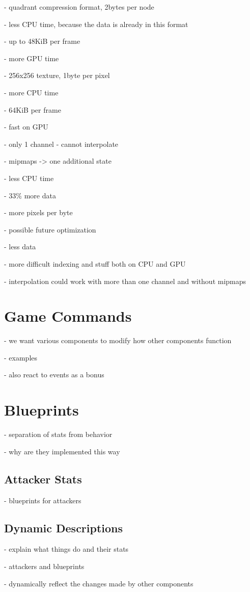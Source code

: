 - quadrant compression format, 2bytes per node

- less CPU time, because the data is already in this format

- up to 48KiB per frame

- more GPU time

- 256x256 texture, 1byte per pixel

- more CPU time

- 64KiB per frame

- fast on GPU

- only 1 channel - cannot interpolate

- mipmaps -> one additional state

- less CPU time

- 33\% more data

- more pixels per byte

- possible future optimization

- less data

- more difficult indexing and stuff both on CPU and GPU

- interpolation could work with more than one channel and without mipmaps

\section{Game Commands}

- we want various components to modify how other components function

- examples

- also react to events as a bonus

\section{Blueprints}

- separation of stats from behavior

- why are they implemented this way

\subsection{Attacker Stats}

- blueprints for attackers

\subsection{Dynamic Descriptions}

- explain what things do and their stats

- attackers and blueprints

- dynamically reflect the changes made by other components
